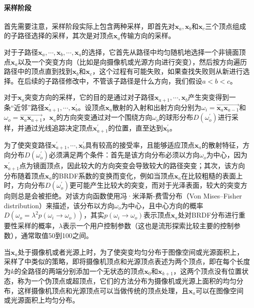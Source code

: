\paragraph{采样阶段}
首先需要注意，采样阶段实际上包含两种采样，即首先对$\mathbf{x}_a,\mathbf{x}_b$和$\mathbf{x}_c$三个顶点组成的子路径选择的采样，其次是对顶点$\mathbf{x}_a$传输方向的采样。

对于子路径$\mathbf{x}_a,\cdots,\mathbf{x}_b,\cdots,\mathbf{x}_a$的选择，它首先从路径中均匀随机地选择一个非镜面顶点$\mathbf{x}_a$以及一个突变方向（比如是向摄像机或光源方向进行突变），然后按方向遍历路径中的顶点直到找到$\mathbf{x}_b$和$\mathbf{x}_c$，这个过程有可能失败，如果查找失败则从新进行选择。在后续的子路径修改中，不管该子路径是什么方向，我们假设$a<b<c$。

对于$\mathbf{x}_a$突变方向的采样，它的目的是通过对子路径$\mathbf{x}_{a+1},\cdots,\mathbf{x}_b$产生突变得到一条“近邻”路径$\mathbf{x}^{'}_{a+1},\cdots,\mathbf{x}^{'}_b$。设顶点$\mathbf{x}_a$散射的入射和出射方向分别为$\omega_i=\overrightarrow{\mathbf{x}_a\mathbf{x}_{a-1}}$和$\omega_o=\overrightarrow{\mathbf{x}_a\mathbf{x}_{a+1}}$，$\mathbf{x}_a$的方向突变通过对一个围绕方向$\omega_o$的球形分布$D(\omega^{'}_o)$进行采样，并通过光线追踪决定顶点$\mathbf{x}^{'}_{a+1}$的位置，直至达到$\mathbf{x}^{'}_b$。

为了使突变路径$\mathbf{x}^{'}_{a+1},\cdots,\mathbf{x}^{'}_b$具有较高的接受率，且能够适应顶点$\mathbf{x}_a$的散射特征，方向分布$D(\omega^{'}_o)$必须满足两个条件：首先是该方向分布必须以方向$\omega_o$为中心，因为$\mathbf{x}^{'}_{a+1}$点为镜面顶点，因此较大的方向突变会导致较大的路径突变；其次，该方向分布随着顶点$\mathbf{x}_a$的BRDF系数的变换而变化，例如当顶点$\mathbf{x}_a$在比较粗糙的表面上时，方向分布$D(\omega^{'}_o)$更可能产生比较大的突变，而对于光泽表面，较大的突变方向则总是会被拒绝。\cite{a:ManifoldExplorationAMarkovChainMonteCarloTechniqueforRenderingSceneswithDifficultSpecularTransport}对该方向函数使用冯·米泽斯-费雪分布（Von Mises–Fisher distribution）\cite{b:Directionalstatistics,b:Statisticalanalysisofsphericaldata}来描述，该分布以方向$\omega_o$为中心，且中心方向的概率$D(\omega_o=\lambda^{2}p(\omega_i\to\omega_o))$，其实$p(\omega_i\to\omega_o)$表示顶点$\mathbf{x}_a$处对BRDF分布进行重要性采样的概率，$\lambda$表示一个用户控制参数（这也是流形探索比较主要的控制参数），通常取值50到100之间。

当$\mathbf{x}_a$处于摄像机或者光源上时，为了使突变均匀分布于图像空间或光源面积上，\cite{a:ManifoldExplorationAMarkovChainMonteCarloTechniqueforRenderingSceneswithDifficultSpecularTransport}采样了\cite{a:MetropolisLightTransport}中类似的策略，即将摄像机顶点和光源顶点表述为两个顶点，即在每个长度为$k$的全路径的两端分别添加一个无状态的顶点$\mathbf{x}_0$和$\mathbf{x}_{k+1}$，这两个顶点没有位置状态，称为一个伪顶点或超顶点，它们的方法分布为摄像机或光源上面积的均匀分布，这样摄像机顶点和光源顶点可以当做传统的顶点处理，且$\mathbf{x}_a$可以在图像空间或光源面积上均匀分布。




